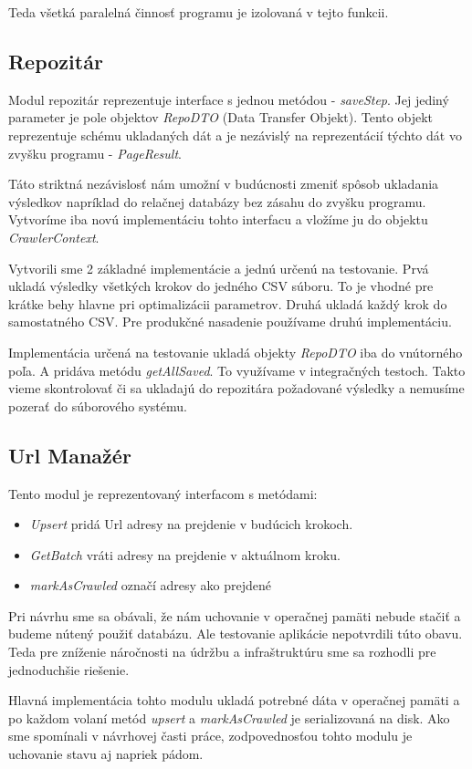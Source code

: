 Teda všetká paralelná činnosť programu je izolovaná v tejto funkcii. 

\subsection{Repozitár}
Modul repozitár reprezentuje interface s jednou metódou - \textit{saveStep}. Jej jediný parameter je pole objektov \textit{RepoDTO} (Data Transfer Objekt). Tento objekt reprezentuje schému ukladaných dát a je nezávislý na reprezentácií týchto dát vo zvyšku programu - \textit{PageResult}. 

Táto striktná nezávislosť nám umožní v budúcnosti zmeniť spôsob ukladania výsledkov napríklad do relačnej databázy bez zásahu do zvyšku programu. Vytvoríme iba novú implementáciu tohto interfacu a vložíme ju do objektu \textit{CrawlerContext}. 

Vytvorili sme 2 základné implementácie a jednú určenú na testovanie. Prvá ukladá výsledky všetkých krokov do jedného CSV súboru. To je vhodné pre krátke behy hlavne pri optimalizácii parametrov. Druhá ukladá každý krok do samostatného CSV. Pre produkčné nasadenie používame druhú implementáciu. 

Implementácia určená na testovanie ukladá objekty \textit{RepoDTO} iba do vnútorného poľa. A pridáva metódu \textit{getAllSaved}. To využívame v integračných testoch. Takto vieme skontrolovať či sa ukladajú do repozitára požadované výsledky a nemusíme pozerať do súborového systému. 


\subsection{Url Manažér}
Tento modul je reprezentovaný interfacom s metódami:
\begin{itemize}
    \item \textit{Upsert} pridá Url adresy na prejdenie v budúcich krokoch. 
    \item \textit{GetBatch} vráti adresy na prejdenie v aktuálnom kroku. 
    \item \textit{markAsCrawled} označí adresy ako prejdené
\end{itemize}


Pri návrhu sme sa obávali, že nám uchovanie v operačnej pamäti nebude stačiť a budeme nútený použiť databázu. Ale testovanie aplikácie nepotvrdili túto obavu. Teda pre zníženie náročnosti na údržbu a infraštruktúru sme sa rozhodli pre jednoduchšie riešenie.

Hlavná implementácia tohto modulu ukladá potrebné dáta v operačnej pamäti a po každom volaní metód \textit{upsert} a \textit{markAsCrawled} je serializovaná na disk. Ako sme spomínali v návrhovej časti práce, zodpovednosťou tohto modulu je uchovanie stavu aj napriek pádom. 


